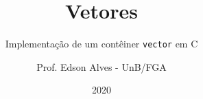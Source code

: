 \title{Vetores}
\subtitle{Implementação de um contêiner \texttt{vector} em C}
\author{Prof. Edson Alves - UnB/FGA}
\date{2020}
